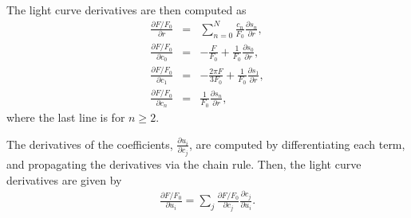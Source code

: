 \documentclass[modern]{aastex61}
\begin{document}
The light curve derivatives are then computed as
\begin{eqnarray}
\frac{\partial F/F_0}{\partial r} &=& \sum_{n=0}^N\frac{ c_n}{F_0} \frac{\partial s_n}{\partial r},\\
\frac{\partial F/F_0}{\partial c_0} &=&  -\frac{ F}{F_0} + \frac{1}{F_0}\frac{\partial s_0}{\partial r},\\
\frac{\partial F/F_0}{\partial c_1} &=&  -\frac{2\pi F}{3F_0} +\frac{1}{F_0}\frac{\partial s_1}{\partial r},\\
\frac{\partial F/F_0}{\partial c_n} &=&  \frac{1}{F_0}\frac{\partial s_n}{\partial r},
\end{eqnarray}
where the last line is for $n \ge 2$.

The derivatives of the coefficients, $\frac{\partial u_i}{\partial c_j}$, are 
computed by differentiating each term, and propagating the derivatives via the
chain rule.  Then, the light curve derivatives are given by
\begin{eqnarray}
\frac{\partial F/F_0}{\partial u_i} =  \sum_{j} \frac{\partial F/F_0}{\partial c_j}\frac{\partial c_j}{\partial u_i}.
\end{eqnarray}
\end{document}
